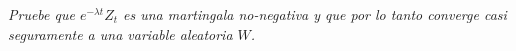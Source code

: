 \emph{
    Pruebe que $e^{-\lambda t}Z_t$ es una martingala no-negativa y que por lo tanto 
    converge casi seguramente a una variable aleatoria $W$.\pn
}

\afterstatement\pn

